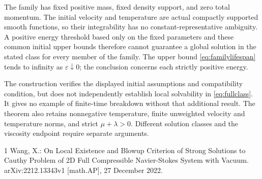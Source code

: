 \documentclass[10pt,twoside]{article}
\begin{document}
The family has fixed positive mass, fixed density support, and zero
total momentum. The initial velocity and temperature are actual
compactly supported smooth functions, so their integrability has no
constant-representative ambiguity. A positive energy threshold based
only on the fixed parameters and these common initial upper bounds
therefore cannot guarantee a global solution in the stated class for
every member of the family. The upper bound
\eqref{eq:familylifespan} tends to infinity as
$\varepsilon\downarrow0$; the conclusion concerns each strictly
positive energy.

The construction verifies the displayed initial assumptions and
compatibility condition, but does not independently establish local
solvability in \eqref{eq:fullclass}. It gives no example of finite-time
breakdown without that additional result. The theorem also retains
nonnegative temperature, finite unweighted velocity and temperature
norms, and strict $\mu+\lambda>0$. Different solution classes and the
viscosity endpoint require separate arguments.

\begin{thebibliography}{1}
Wang, X.:
On Local Existence and Blowup Criterion of Strong Solutions to
Cauthy Problem of 2D Full Compressible Navier-Stokes System with Vacuum.
arXiv:2212.13343v1 [math.AP], 27 December 2022.
\end{thebibliography}
\end{document}
